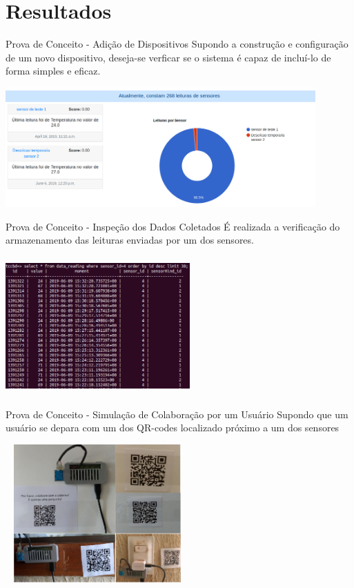 \documentclass{beamer}
\begin{document}
  \section{Resultados}

    \begin{frame}{ Prova de Conceito - Adição de Dispositivos}
      Supondo a construção e configuração de um novo dispositivo, deseja-se verficar se o sistema é capaz de incluí-lo de forma simples e eficaz.
      \begin{center}
      \includegraphics[height=130pt, width=\textwidth]{prova2}
      \end{center}
    \end{frame}
    \begin{frame}{Prova de Conceito - Inspeção dos Dados Coletados}
      É realizada a verificação do armazenamento das leituras enviadas por um dos sensores.
      \begin{center}
      \includegraphics[height=150pt, width=200pt]{prova4}
      \end{center}
    \end{frame}
    \begin{frame}{Prova de Conceito - Simulação de Colaboração por um Usuário}
      Supondo que um usuário se depara com um dos QR-codes localizado próximo a um dos sensores
      \begin{center}
      \includegraphics[height=150pt, width=200pt]{prova5}
      \end{center}
    \end{frame}
\end{document}
